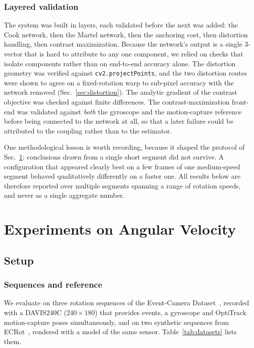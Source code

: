 \documentclass[journal]{IEEEtran}
\begin{document}
\subsubsection{Layered validation}
The system was built in layers, each validated before the next was added: the
Cook network, then the Martel network, then the anchoring cost, then distortion
handling, then contrast maximization. Because the network's output is a single
3-vector that is hard to attribute to any one component, we relied on checks that
isolate components rather than on end-to-end accuracy alone. The distortion
geometry was verified against \texttt{cv2.projectPoints}, and the two distortion routes were shown to agree on a fixed-rotation warp
to sub-pixel accuracy with the network removed
(Sec.~\ref{sec:distortion}). The analytic gradient of the contrast objective was
checked against finite differences. The contrast-maximization front-end was
validated against \emph{both} the gyroscope and the motion-capture reference
before being connected to
the network at all, so that a later failure could be attributed to the coupling
rather than to the estimator.

One methodological lesson is worth recording, because it shaped the protocol of
Sec.~\ref{sec:experiments}: conclusions drawn from a single short segment did not
survive. A configuration that appeared clearly best on a few frames of one
medium-speed segment behaved qualitatively differently on a faster one. All
results below are therefore reported over multiple segments spanning a range of
rotation speeds, and never as a single aggregate number.


\section{Experiments on Angular Velocity}
\label{sec:experiments}

\subsection{Setup}
\label{sec:protocol}

\subsubsection{Sequences and reference}

We evaluate on three rotation sequences of the Event-Camera
Dataset~\cite{mueggler2017}, recorded with a DAVIS240C ($240\times180$) that
provides events, a gyroscope and OptiTrack motion-capture poses simultaneously,
and on two synthetic sequences from ECRot~\cite{guo2024cmaxslam}, rendered with
a model of the same sensor. Table~\ref{tab:datasets} lists them.
\end{document}
